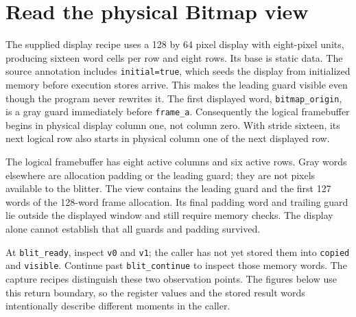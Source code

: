 \section{Read the physical Bitmap view}\label{blit-view}
The supplied display recipe uses a 128 by 64 pixel display with eight-pixel units, producing sixteen word cells per row and eight rows. Its base is static data. The source annotation includes \texttt{initial=true}, which seeds the display from initialized memory before execution stores arrive. This makes the leading guard visible even though the program never rewrites it. The first displayed word, \texttt{bitmap\_origin}, is a gray guard immediately before \texttt{frame\_a}. Consequently the logical framebuffer begins in physical display column one, not column zero. With stride sixteen, its next logical row also starts in physical column one of the next displayed row.

The logical framebuffer has eight active columns and six active rows. Gray words elsewhere are allocation padding or the leading guard; they are not pixels available to the blitter. The view contains the leading guard and the first 127 words of the 128-word frame allocation. Its final padding word and trailing guard lie outside the displayed window and still require memory checks. The display alone cannot establish that all guards and padding survived.

At \texttt{blit\_ready}, inspect \texttt{v0} and \texttt{v1}; the caller has not yet stored them into \texttt{copied} and \texttt{visible}. Continue past \texttt{blit\_continue} to inspect those memory words. The capture recipes distinguish these two observation points. The figures below use this return boundary, so the register values and the stored result words intentionally describe different moments in the caller.
